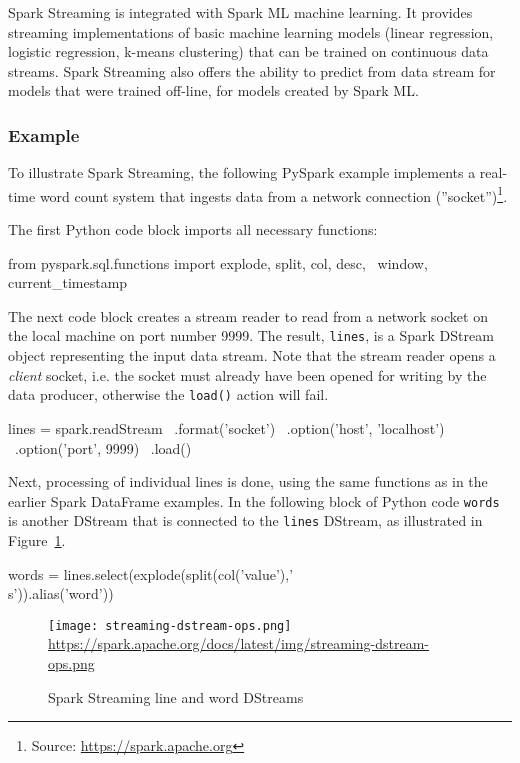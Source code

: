 Spark Streaming is integrated with Spark ML machine learning. It provides streaming implementations of basic machine learning models (linear regression, logistic regression, k-means clustering) that can be trained on continuous data streams. Spark Streaming also offers the ability to predict from data stream for models that were trained off-line, for models created by Spark ML.

\subsubsection*{Example}

To illustrate Spark Streaming, the following PySpark example implements a real-time word count system that ingests data from a network connection (''socket'')\footnote{Source: \url{https://spark.apache.org}}.

The first Python code block imports all necessary functions:

\begin{pythoncode}
from pyspark.sql.functions import explode, split, col, desc, \
    window, current_timestamp
\end{pythoncode}

The next code block creates a stream reader to read from a network socket on the local machine on port number 9999. The result, \texttt{lines}, is a Spark DStream object representing the input data stream. Note that the stream reader opens a \emph{client} socket, i.e. the socket must already have been opened for writing by the data producer, otherwise the \texttt{load()} action will fail.

\begin{pythoncode}
lines = spark.readStream \
             .format('socket') \
             .option('host', 'localhost') \
             .option('port', 9999) \
             .load()
\end{pythoncode}

Next, processing of individual lines is done, using the same functions as in the earlier Spark DataFrame examples. In the following block of Python code \texttt{words} is another DStream that is connected to the \texttt{lines} DStream, as illustrated in Figure~\ref{fig:sparkwordcount}.

\begin{pythoncode}
words = lines.select(explode(split(col('value'),'\\s')).alias('word'))
\end{pythoncode}

\begin{figure}
\centering

\texttt{[image: streaming-dstream-ops.png]}
\scriptsize\url{https://spark.apache.org/docs/latest/img/streaming-dstream-ops.png}\normalsize
\caption{Spark Streaming line and word DStreams}
\label{fig:sparkwordcount}
\end{figure}

